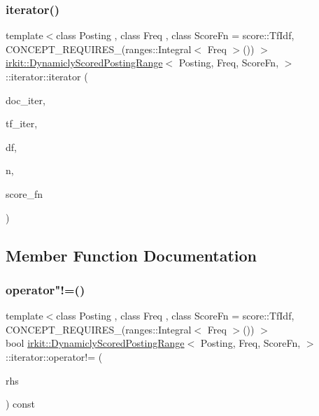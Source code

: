 \subsubsection{\texorpdfstring{iterator()}{iterator()}}
{\footnotesize\ttfamily template$<$class Posting , class Freq , class Score\+Fn  = score\+::\+Tf\+Idf, C\+O\+N\+C\+E\+P\+T\+\_\+\+R\+E\+Q\+U\+I\+R\+E\+S\+\_\+(ranges\+::\+Integral$<$ Freq $>$()) $>$ \\
\mbox{\hyperlink{classirkit_1_1DynamiclyScoredPostingRange}{irkit\+::\+Dynamicly\+Scored\+Posting\+Range}}$<$ Posting, Freq, Score\+Fn, $>$\+::iterator\+::iterator (\begin{DoxyParamCaption}\item[{typename std\+::vector$<$ Doc $>$\+::const\+\_\+iterator}]{doc\+\_\+iter,  }\item[{typename std\+::vector$<$ Freq $>$\+::const\+\_\+iterator}]{tf\+\_\+iter,  }\item[{Freq}]{df,  }\item[{std\+::size\+\_\+t}]{n,  }\item[{Score\+Fn}]{score\+\_\+fn }\end{DoxyParamCaption})\hspace{0.3cm}{\ttfamily [inline]}}



\subsection{Member Function Documentation}
\mbox{\label{classirkit_1_1DynamiclyScoredPostingRange_1_1iterator_a37c62809d2e9dd22e2be51833bf9de38}} 
\subsubsection{\texorpdfstring{operator"!=()}{operator!=()}}
{\footnotesize\ttfamily template$<$class Posting , class Freq , class Score\+Fn  = score\+::\+Tf\+Idf, C\+O\+N\+C\+E\+P\+T\+\_\+\+R\+E\+Q\+U\+I\+R\+E\+S\+\_\+(ranges\+::\+Integral$<$ Freq $>$()) $>$ \\
bool \mbox{\hyperlink{classirkit_1_1DynamiclyScoredPostingRange}{irkit\+::\+Dynamicly\+Scored\+Posting\+Range}}$<$ Posting, Freq, Score\+Fn, $>$\+::iterator\+::operator!= (\begin{DoxyParamCaption}\item[{const \mbox{\hyperlink{classirkit_1_1DynamiclyScoredPostingRange_1_1iterator}{iterator}} \&}]{rhs }\end{DoxyParamCaption}) const\hspace{0.3cm}{\ttfamily [inline]}}

